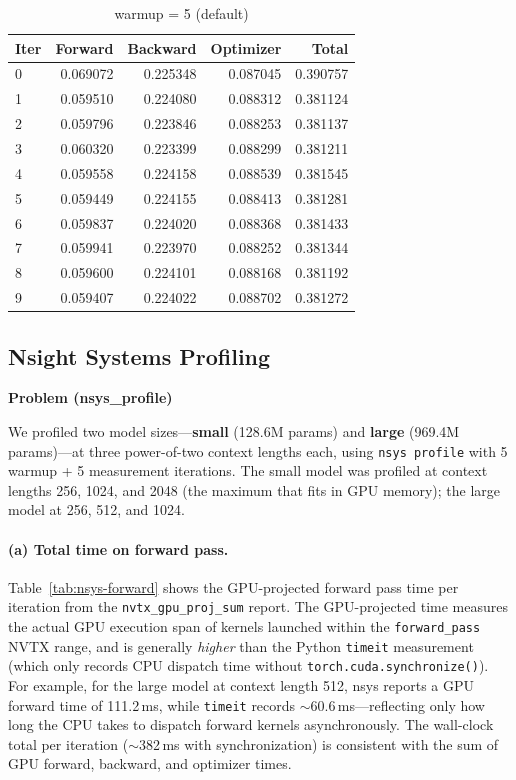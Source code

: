 \documentclass[11pt]{article}
\begin{document}
\begin{table}[H]
\vspace{0.5em}

\begin{subtable}{\textwidth}
\centering
\caption{warmup = 5 (default)}
\begin{tabular}{lrrrr}
  \toprule
  Iter & Forward & Backward & Optimizer & Total \\
  \midrule
  0 & 0.069072 & 0.225348 & 0.087045 & 0.390757 \\
  1 & 0.059510 & 0.224080 & 0.088312 & 0.381124 \\
  2 & 0.059796 & 0.223846 & 0.088253 & 0.381137 \\
  3 & 0.060320 & 0.223399 & 0.088299 & 0.381211 \\
  4 & 0.059558 & 0.224158 & 0.088539 & 0.381545 \\
  5 & 0.059449 & 0.224155 & 0.088413 & 0.381281 \\
  6 & 0.059837 & 0.224020 & 0.088368 & 0.381433 \\
  7 & 0.059941 & 0.223970 & 0.088252 & 0.381344 \\
  8 & 0.059600 & 0.224101 & 0.088168 & 0.381192 \\
  9 & 0.059407 & 0.224022 & 0.088702 & 0.381272 \\
  \bottomrule
\end{tabular}
\end{subtable}

\end{table}

\subsection{Nsight Systems Profiling}
\textbf{Problem (nsys\_profile)}

We profiled two model sizes---\textbf{small} (128.6M params) and
\textbf{large} (969.4M params)---at three power-of-two context lengths each,
using \texttt{nsys profile} with 5 warmup + 5 measurement iterations.
The small model was profiled at context lengths 256, 1024, and 2048 (the
maximum that fits in GPU memory); the large model at 256, 512, and 1024.

\paragraph{(a) Total time on forward pass.}

Table~\ref{tab:nsys-forward} shows the GPU-projected forward pass time
per iteration from the \texttt{nvtx\_gpu\_proj\_sum} report.
The GPU-projected time measures the actual GPU execution span of kernels
launched within the \texttt{forward\_pass} NVTX range, and is generally
\emph{higher} than the Python \texttt{timeit} measurement (which only
records CPU dispatch time without \texttt{torch.cuda.synchronize()}).
For example, for the large model at context length 512, nsys reports a
GPU forward time of 111.2\,ms, while \texttt{timeit} records
$\sim$60.6\,ms---reflecting only how long the CPU takes to dispatch
forward kernels asynchronously.
The wall-clock total per iteration ($\sim$382\,ms with synchronization)
is consistent with the sum of GPU forward, backward, and optimizer times.
\end{document}
